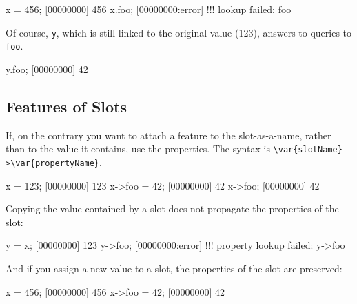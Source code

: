 \begin{urbiscript}
x = 456;
[00000000] 456
x.foo;
[00000000:error] !!! lookup failed: foo
\end{urbiscript}

Of course, \lstinline|y|, which is still linked to the original value (123),
answers to queries to \lstinline|foo|.

\begin{urbiscript}
y.foo;
[00000000] 42
\end{urbiscript}

\subsection{Features of Slots}

If, on the contrary you want to attach a feature to the slot-as-a-name,
rather than to the value it contains, use the properties.  The syntax is
\lstinline|\var{slotName}->\var{propertyName}|.

\begin{urbiscript}
x = 123;
[00000000] 123
x->foo = 42;
[00000000] 42
x->foo;
[00000000] 42
\end{urbiscript}

Copying the value contained by a slot does not propagate the properties of
the slot:

\begin{urbiscript}
y = x;
[00000000] 123
y->foo;
[00000000:error] !!! property lookup failed: y->foo
\end{urbiscript}

And if you assign a new value to a slot, the properties of the slot are
preserved:

\begin{urbiscript}
x = 456;
[00000000] 456
x->foo = 42;
[00000000] 42
\end{urbiscript}


